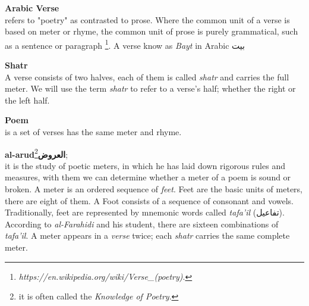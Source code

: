 \begin{definition}\label{def:verse}
  \textbf{Arabic Verse} \hfill \\ refers to "poetry" as contrasted to prose. Where the common unit of a verse is based on meter or rhyme, the common unit of prose is purely grammatical, such as a sentence or paragraph \footnote{\textit{ https://en.wikipedia.org/wiki/Verse\_(poetry)}.}. A verse know as \textit{Bayt} in Arabic \textarabic{بيت}


\end{definition}


\begin{definition}\label{def:shatr}
  \textbf{Shatr} \hfill \\  A verse consists of two halves, each of them is called \textit{shatr} and carries the full meter.  We will use the term \textit{shatr} to refer to a verse's half; whether the right or the left half.
\end{definition}



\begin{definition}\label{def:poem}
  \textbf{Poem} \hfill \\
  is a set of verses has the same meter and rhyme.  

\end{definition}

\begin{definition}\label{def:arud}
  \textbf{al-arud\textarabic{العروض}}\footnote{it is often called the \textit{Knowledge of Poetry}.}; \hfill \\
 it is the study of poetic meters, in which he has laid down rigorous
rules and measures, with them we can determine whether a meter of a poem is sound
or broken. A meter is an ordered sequence of \textit{feet}. Feet are the basic
units of meters, there are eight of them. A Foot consists of a sequence of
consonant and vowels. Traditionally, feet are represented by mnemonic words
called \textit{tafa'il} (\textarabic{تفاعيل}).  According to \textit{al-Farahidi}
and his student, there are sixteen combinations of \textit{tafa'il}. A meter
appears in a \textit{verse} twice; each \textit{shatr} carries the same complete
meter.%


\end{definition}




